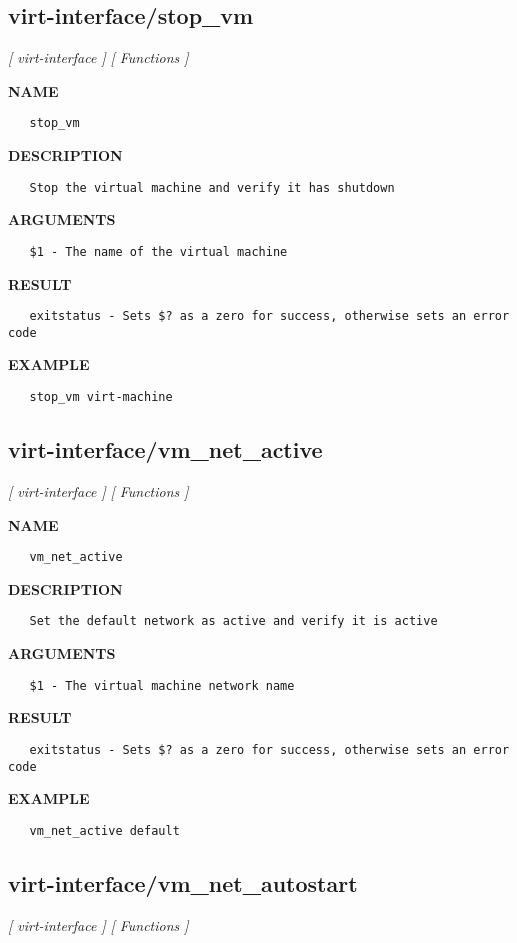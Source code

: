 \subsection{virt-interface/stop\_vm}
\textsl{[ virt-interface ]}
\textsl{[ Functions ]}

\label{ch:robo68}
\label{ch:virt_interface_stop_vm}
\textbf{NAME}
\begin{verbatim}
   stop_vm
\end{verbatim}
\textbf{DESCRIPTION}
\begin{verbatim}
   Stop the virtual machine and verify it has shutdown
\end{verbatim}
\textbf{ARGUMENTS}
\begin{verbatim}
   $1 - The name of the virtual machine
\end{verbatim}
\textbf{RESULT}
\begin{verbatim}
   exitstatus - Sets $? as a zero for success, otherwise sets an error code
\end{verbatim}
\textbf{EXAMPLE}
\begin{verbatim}
   stop_vm virt-machine
\end{verbatim}
\newpage
\subsection{virt-interface/vm\_net\_active}
\textsl{[ virt-interface ]}
\textsl{[ Functions ]}

\label{ch:robo69}
\label{ch:virt_interface_vm_net_active}
\textbf{NAME}
\begin{verbatim}
   vm_net_active
\end{verbatim}
\textbf{DESCRIPTION}
\begin{verbatim}
   Set the default network as active and verify it is active
\end{verbatim}
\textbf{ARGUMENTS}
\begin{verbatim}
   $1 - The virtual machine network name
\end{verbatim}
\textbf{RESULT}
\begin{verbatim}
   exitstatus - Sets $? as a zero for success, otherwise sets an error code
\end{verbatim}
\textbf{EXAMPLE}
\begin{verbatim}
   vm_net_active default
\end{verbatim}
\newpage
\subsection{virt-interface/vm\_net\_autostart}
\textsl{[ virt-interface ]}
\textsl{[ Functions ]}


